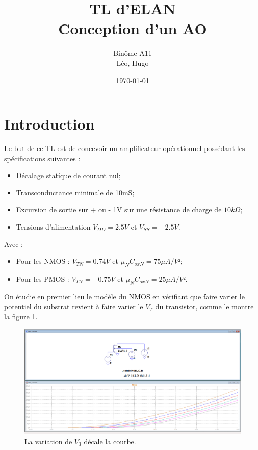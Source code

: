 \documentclass[french]{article}
\title{TL d'ELAN\\Conception d'un AO}
\author{Binôme A11 \\ \bsc{Simon} Léo, \bsc{Levy--Falk} Hugo}
\date{\today}
\begin{document}
	\maketitle
	
	\tableofcontents
	\listoffigures
	\newpage
	

\part*{ Introduction}

Le but de ce TL est de concevoir un amplificateur opérationnel possédant les spécifications suivantes :

\begin{itemize}
	\item Décalage statique de courant nul;
	\item Transconductance minimale de 10mS;
	\item Excursion de sortie sur + ou - 1V sur une résistance de charge de $10k\Omega$;
	\item Tensions d'alimentation $V_{DD}=2.5V$ et $V_{SS}=-2.5V$.
\end{itemize}

Avec :

\begin{itemize}
	\item Pour les NMOS : $V_{TN}=0.74V$ et $\mu_N C_{oxN} = 75 \mu A/V²$;
	\item Pour les PMOS : $V_{TN}=-0.75V$ et $\mu_N C_{oxN} = 25 \mu A/V²$.
\end{itemize}

On étudie en premier lieu le modèle du NMOS en vérifiant que faire varier le potentiel du substrat revient à faire varier le $V_T$ du transistor, comme le montre la figure \ref{caracMOS}.

\begin{figure}[h!]
\includegraphics[width=\textwidth]{images/MOSCarac.PNG}
\caption{La variation de $V_3$ décale la courbe.}
\label{caracMOS}
\end{figure}
\end{document}
